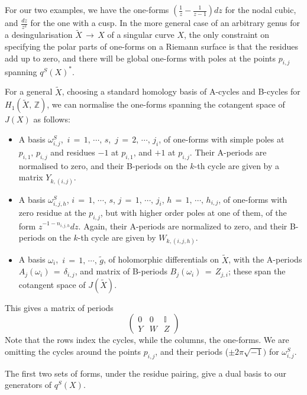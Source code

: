 \documentclass[12pt,reqno]{amsart}
\numberwithin{equation}{section}
\theoremstyle{definition}
\theoremstyle{remark}
\def\bZ{{\mathbb {Z}}}
\def\bI{{\mathbb {I}}}
\begin{document}
For our two examples, we have the one-forms $(\frac{1}{z} -\frac{1}{z-1}) dz$ for the nodal cubic, and
$\frac{dz}{z^2} $ for the one with a cusp. In the more general case of an arbitrary genus
for a desingularisation $\widetilde X\,\longrightarrow\, X$ of a singular curve $X$,
the only constraint on specifying the polar parts of one-forms on a Riemann surface is that the residues
add up to zero, and there will be global one-forms with poles at the points $p_{i,j}$ spanning $q^S(X)^*$. 

For a general $\widetilde X$, choosing a standard homology basis of A-cycles and B-cycles for $H_1(\widetilde X,\,
\bZ)$, we can normalise the one-forms spanning the cotangent space of $J(X)$ as follows:
\begin{itemize}
\item A basis $\omega^S_{i, j}$,\, $i\,=\,1,\,\cdots ,\,s$,\, $j\,=\, 2,\,\cdots ,\,j_i$, of one-forms
with simple poles at $p_{i, 1},\, p_{i, j}$ and residues $-1$ at $p_{i, 1}$, and $+1$ at $p_{i, j}$. Their
A-periods are normalised to zero, and their B-periods  on the $k$-th cycle are given
by a matrix $Y_{k, (i, j)}$.
 
\item A basis $\omega^S_{i,j,h }$, $i\,=\,1,\,\cdots ,\,s$, $j\,=\,1,\,\cdots,\,j_i$, $h\,=\,1,\,\cdots ,\,h_{i,j}$, of one-forms with
zero residue at the $p_{i,j}$, but with higher order poles at one of them, of the form $z^{-1-n_{i,j,h} }dz$. Again, their A-periods are normalized to zero, and their B-periods on the $k$-th cycle are given by $W_{k,(i,j,h)}$.
 \item A basis $\omega_i$,\, $i\,=\,1,\,\cdots ,\,\widetilde g$, of holomorphic differentials on
$\widetilde X$, with the A-periods $A_j(\omega_i) \,=\, \delta_{i,j}$, and matrix of B-periods
$B_j(\omega_i) \,=\, Z_{j,i}$; these span the cotangent space of $J(\widetilde X)$.

\end{itemize}
This gives a matrix of periods 
\begin{equation} \begin{pmatrix} 0&0&\bI\\Y& W& Z\end{pmatrix}\end{equation}
Note that the rows index the cycles, while the columns, the one-forms. We are omitting the cycles
around the points $p_{i,j}$, and their periods  ($\pm 2 \pi\sqrt{-1})$ for $\omega^S_{i, j}$.


The first two sets of forms, under the residue pairing, give a dual basis to  our  generators of $q^S(X)$.
 
\end{document}
